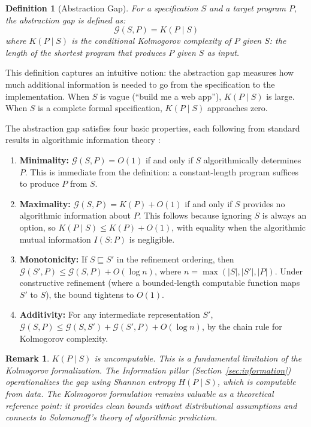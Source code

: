 \documentclass[11pt, a4paper, logo, copyright]{googledeepmind}
\newtheorem{definition}{Definition}[section]
\newtheorem*{remark}{Remark}
\begin{document}
\begin{definition}[Abstraction Gap]
\label{def:abstraction-gap}
For a specification $S$ and a target program $P$, the \emph{abstraction gap} is defined as:
\begin{equation}
    \mathcal{G}(S, P) = K(P \mid S)
\end{equation}
where $K(P \mid S)$ is the conditional Kolmogorov complexity of $P$ given $S$: the length of the shortest program that produces $P$ given $S$ as input.
\end{definition}

This definition captures an intuitive notion: the abstraction gap measures how much additional information is needed to go from the specification to the implementation. When $S$ is vague (``build me a web app''), $K(P \mid S)$ is large. When $S$ is a complete formal specification, $K(P \mid S)$ approaches zero.

The abstraction gap satisfies four basic properties, each following from standard results in algorithmic information theory \citep{li2019introduction}:

\begin{enumerate}[label=(\alph*)]
    \item \textbf{Minimality:} $\mathcal{G}(S, P) = O(1)$ if and only if $S$ algorithmically determines $P$. This is immediate from the definition: a constant-length program suffices to produce $P$ from $S$.
    \item \textbf{Maximality:} $\mathcal{G}(S, P) = K(P) + O(1)$ if and only if $S$ provides no algorithmic information about $P$. This follows because ignoring $S$ is always an option, so $K(P \mid S) \leq K(P) + O(1)$, with equality when the algorithmic mutual information $I(S : P)$ is negligible.
    \item \textbf{Monotonicity:} If $S \sqsubseteq S'$ in the refinement ordering, then $\mathcal{G}(S', P) \leq \mathcal{G}(S, P) + O(\log n)$, where $n = \max(|S|, |S'|, |P|)$. Under constructive refinement (where a bounded-length computable function maps $S'$ to $S$), the bound tightens to $O(1)$.
    \item \textbf{Additivity:} For any intermediate representation $S'$, $\mathcal{G}(S, P) \leq \mathcal{G}(S, S') + \mathcal{G}(S', P) + O(\log n)$, by the chain rule for Kolmogorov complexity.
\end{enumerate}

\begin{remark}
$K(P \mid S)$ is uncomputable. This is a fundamental limitation of the Kolmogorov formalization. The Information pillar (Section~\ref{sec:information}) operationalizes the gap using Shannon entropy $H(P \mid S)$, which is computable from data. The Kolmogorov formulation remains valuable as a theoretical reference point: it provides clean bounds without distributional assumptions and connects to Solomonoff's theory of algorithmic prediction.
\end{remark}
\end{document}
